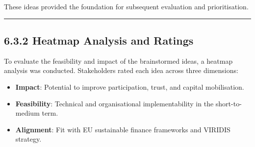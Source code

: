 \documentclass[
  english,
  12pt,
  oneside,
  open=any]{scrbook}
\providecommand{\tightlist}{%
  \setlength{\itemsep}{0pt}\setlength{\parskip}{0pt}}\usepackage{longtable,booktabs,array}
\begin{document}
These ideas provided the foundation for subsequent evaluation and
prioritisation.

\begin{center}\rule{0.5\linewidth}{0.5pt}\end{center}

\subsection{6.3.2 Heatmap Analysis and Ratings}\label{sec-heatmap}

To evaluate the feasibility and impact of the brainstormed ideas, a
heatmap analysis was conducted. Stakeholders rated each idea across
three dimensions:

\begin{itemize}
\tightlist
\item
  \textbf{Impact}: Potential to improve participation, trust, and
  capital mobilisation.\\
\item
  \textbf{Feasibility}: Technical and organisational implementability in
  the short-to-medium term.\\
\item
  \textbf{Alignment}: Fit with EU sustainable finance frameworks and
  VIRIDIS strategy.
\end{itemize}
\end{document}
